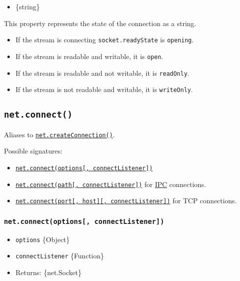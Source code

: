 \begin{itemize}
\tightlist
\item
  \{string\}
\end{itemize}

This property represents the state of the connection as a string.

\begin{itemize}
\tightlist
\item
  If the stream is connecting \texttt{socket.readyState} is
  \texttt{opening}.
\item
  If the stream is readable and writable, it is \texttt{open}.
\item
  If the stream is readable and not writable, it is \texttt{readOnly}.
\item
  If the stream is not readable and writable, it is \texttt{writeOnly}.
\end{itemize}

\subsection{\texorpdfstring{\texttt{net.connect()}}{net.connect()}}\label{net.connect}

Aliases to
\hyperref[netcreateconnection]{\texttt{net.createConnection()}}.

Possible signatures:

\begin{itemize}
\tightlist
\item
  \hyperref[netconnectoptions-connectlistener]{\texttt{net.connect(options{[},\ connectListener{]})}}
\item
  \hyperref[netconnectpath-connectlistener]{\texttt{net.connect(path{[},\ connectListener{]})}}
  for \hyperref[ipc-support]{IPC} connections.
\item
  \hyperref[netconnectport-host-connectlistener]{\texttt{net.connect(port{[},\ host{]}{[},\ connectListener{]})}}
  for TCP connections.
\end{itemize}

\subsubsection{\texorpdfstring{\texttt{net.connect(options{[},\ connectListener{]})}}{net.connect(options{[}, connectListener{]})}}\label{net.connectoptions-connectlistener}

\begin{itemize}
\tightlist
\item
  \texttt{options} \{Object\}
\item
  \texttt{connectListener} \{Function\}
\item
  Returns: \{net.Socket\}
\end{itemize}

